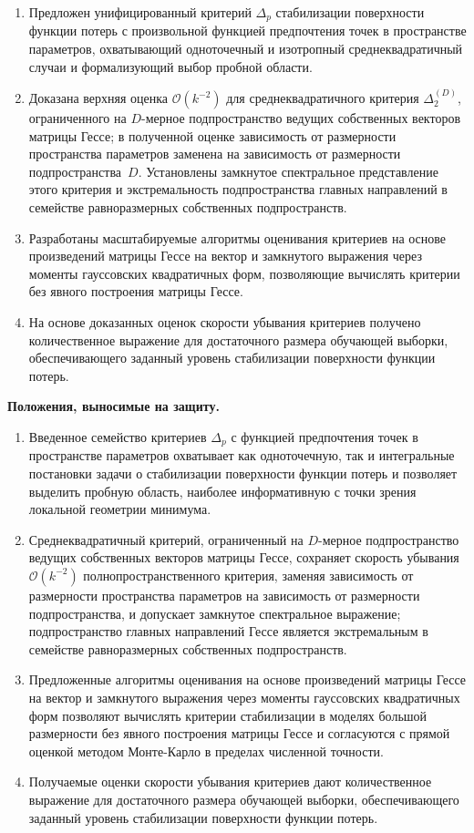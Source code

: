 \begin{enumerate}
    \item Предложен унифицированный критерий $\Delta_p$ стабилизации поверхности функции потерь с произвольной функцией предпочтения точек в пространстве параметров, охватывающий одноточечный и изотропный среднеквадратичный случаи и формализующий выбор пробной области.
    \item Доказана верхняя оценка $\mathcal{O}(k^{-2})$ для среднеквадратичного критерия $\Delta_2^{(D)}$, ограниченного на $D$-мерное подпространство ведущих собственных векторов матрицы Гессе; в полученной оценке зависимость от размерности пространства параметров заменена на зависимость от размерности подпространства~$D$. Установлены замкнутое спектральное представление этого критерия и экстремальность подпространства главных направлений в семействе равноразмерных собственных подпространств.
    \item Разработаны масштабируемые алгоритмы оценивания критериев на основе произведений матрицы Гессе на вектор и замкнутого выражения через моменты гауссовских квадратичных форм, позволяющие вычислять критерии без явного построения матрицы Гессе.
    \item На основе доказанных оценок скорости убывания критериев получено количественное выражение для достаточного размера обучающей выборки, обеспечивающего заданный уровень стабилизации поверхности функции потерь.
\end{enumerate}

\textbf{Положения, выносимые на защиту.}

\begin{enumerate}
    \item Введенное семейство критериев $\Delta_p$ с функцией предпочтения точек в пространстве параметров охватывает как одноточечную, так и интегральные постановки задачи о стабилизации поверхности функции потерь и позволяет выделить пробную область, наиболее информативную с точки зрения локальной геометрии минимума.
    \item Среднеквадратичный критерий, ограниченный на $D$-мерное подпространство ведущих собственных векторов матрицы Гессе, сохраняет скорость убывания $\mathcal{O}(k^{-2})$ полнопространственного критерия, заменяя зависимость от размерности пространства параметров на зависимость от размерности подпространства, и допускает замкнутое спектральное выражение; подпространство главных направлений Гессе является экстремальным в семействе равноразмерных собственных подпространств.
    \item Предложенные алгоритмы оценивания на основе произведений матрицы Гессе на вектор и замкнутого выражения через моменты гауссовских квадратичных форм позволяют вычислять критерии стабилизации в моделях большой размерности без явного построения матрицы Гессе и согласуются с прямой оценкой методом Монте-Карло в пределах численной точности.
    \item Получаемые оценки скорости убывания критериев дают количественное выражение для достаточного размера обучающей выборки, обеспечивающего заданный уровень стабилизации поверхности функции потерь.
\end{enumerate}

